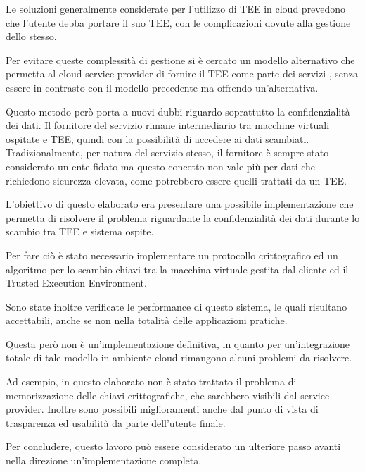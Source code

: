 \documentclass[12pt,italian]{report}
\begin{document}
	\medbreak
	
	Le soluzioni generalmente considerate per l'utilizzo di TEE in cloud prevedono che l'utente debba portare il suo TEE, con le complicazioni dovute alla gestione dello stesso. 
	
	Per evitare queste complessità di gestione si è cercato un modello alternativo che permetta al cloud service provider di fornire il TEE come parte dei servizi \cite{tesi_cutecchia}, senza essere in contrasto con il modello precedente ma offrendo un'alternativa. 
	
	Questo metodo però porta a nuovi dubbi riguardo soprattutto la confidenzialità dei dati. Il fornitore del servizio rimane intermediario tra macchine virtuali ospitate e TEE, quindi con la possibilità di accedere ai dati scambiati. Tradizionalmente, per natura del servizio stesso, il fornitore è sempre stato considerato un ente fidato ma questo concetto non vale più per dati che richiedono sicurezza elevata, come potrebbero essere quelli trattati da un TEE. 
	
	\medbreak
	
	L'obiettivo di questo elaborato era presentare una possibile implementazione che permetta di risolvere il problema riguardante la confidenzialità dei dati durante lo scambio tra TEE e sistema ospite.
	
	Per fare ciò è stato necessario implementare un protocollo crittografico ed un algoritmo per lo scambio chiavi tra la macchina virtuale gestita dal cliente ed il Trusted Execution Environment. 
	
	Sono state inoltre verificate le performance di questo sistema, le quali risultano accettabili, anche se non nella totalità delle applicazioni pratiche.
	
	\medbreak
	
	Questa però non è un'implementazione definitiva, in quanto per un'integrazione totale di tale modello in ambiente cloud rimangono alcuni problemi da risolvere. 
	
	Ad esempio, in questo elaborato non è stato trattato il problema di memorizzazione delle chiavi crittografiche, che sarebbero visibili dal service provider. Inoltre sono possibili miglioramenti anche dal punto di vista di trasparenza ed usabilità da parte dell'utente finale.
	
	Per concludere, questo lavoro può essere considerato un ulteriore passo avanti nella direzione un'implementazione completa.
	
	
	
	
\end{document}
